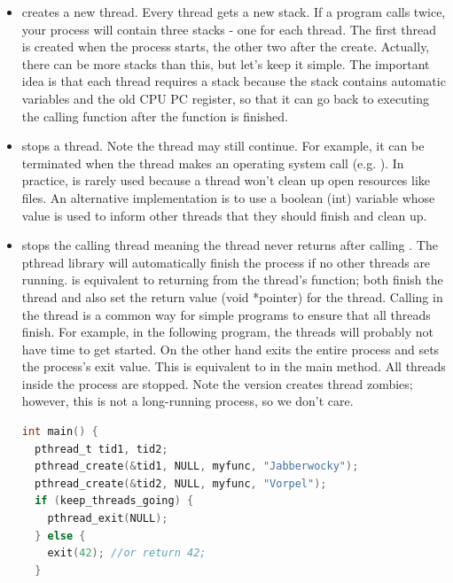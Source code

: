 \begin{itemize}
\item {} creates a new thread.
Every thread gets a new stack.
If a program calls  twice, your process will contain three stacks - one for each thread.
The first thread is created when the process starts, the other two after the create.
Actually, there can be more stacks than this, but let's keep it simple.
The important idea is that each thread requires a stack because the stack contains automatic variables and the old CPU PC register, so that it can go back to executing the calling function after the function is finished.

\item {} stops a thread.
Note the thread may still continue.
For example, it can be terminated when the thread makes an operating system call (e.g. ).
In practice,  is rarely used because a thread won't clean up open resources like files.
An alternative implementation is to use a boolean (int) variable whose value is used to inform other threads that they should finish and clean up.

\item {} stops the calling thread meaning the thread never returns after calling .
The pthread library will automatically finish the process if no other threads are running.
 is equivalent to returning from the thread's function; both finish the thread and also set the return value (void *pointer) for the thread.
Calling  in the  thread is a common way for simple programs to ensure that all threads finish.
For example, in the following program, the  threads will probably not have time to get started.
On the other hand  exits the entire process and sets the process's exit value.
This is equivalent to  in the main method.
All threads inside the process are stopped.
Note the  version creates thread zombies; however, this is not a long-running process, so we don't care.

\begin{lstlisting}[language=C]
int main() {
  pthread_t tid1, tid2;
  pthread_create(&tid1, NULL, myfunc, "Jabberwocky");
  pthread_create(&tid2, NULL, myfunc, "Vorpel");
  if (keep_threads_going) {
    pthread_exit(NULL);
  } else {
    exit(42); //or return 42;
  }


\end{lstlisting}
\end{itemize}
